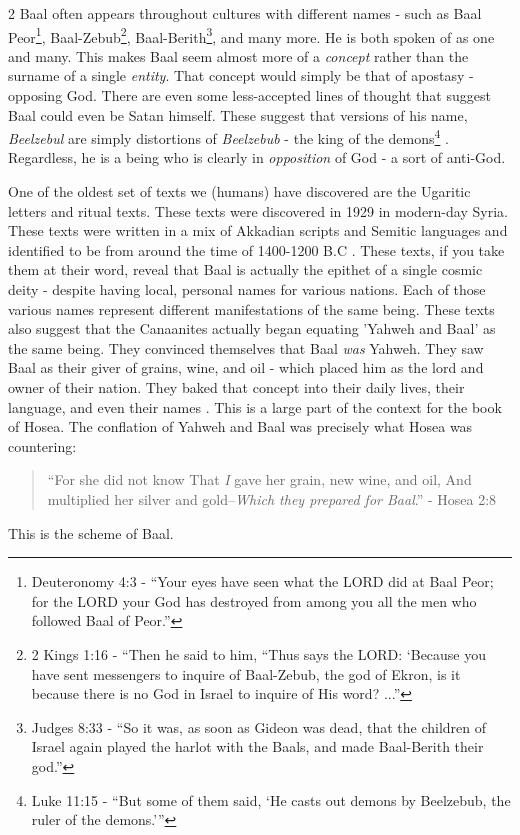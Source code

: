 \documentclass[10pt]{article}
\begin{document}
\begin{multicols}{2}
Baal often appears throughout cultures with different names - such as Baal Peor\footnote{Deuteronomy 4:3 - ``Your eyes have seen what the LORD did at Baal Peor; for the LORD your God has destroyed from among you all the men who followed Baal of Peor.''}, Baal-Zebub\footnote{2 Kings 1:16 - ``Then he said to him, ``Thus says the LORD: ‘Because you have sent messengers to inquire of Baal-Zebub, the god of Ekron, is it because there is no God in Israel to inquire of His word? ...''}, Baal-Berith\footnote{Judges 8:33 - ``So it was, as soon as Gideon was dead, that the children of Israel again played the harlot with the Baals, and made Baal-Berith their god.''}, and many more. He is both spoken of as one and many. This makes Baal seem almost more of a \textit{concept} rather than the surname of a single \textit{entity}. That concept would simply be that of apostasy - opposing God. There are even some less-accepted lines of thought that suggest Baal could even be Satan himself. These suggest that versions of his name, \textit{Beelzebul} are simply distortions of \textit{Beelzebub} - the king of the demons\footnote{Luke 11:15 - ``But some of them said, `He casts out demons by Beelzebub, the ruler of the demons.'\thinspace''} \cite{Yahweh and gods}. Regardless, he is a being who is clearly in \textit{opposition} of God - a sort of anti-God.

One of the oldest set of texts we (humans) have discovered are the Ugaritic letters and ritual texts. These texts were discovered in 1929 in modern-day Syria. These texts were written in a mix of Akkadian scripts and Semitic languages and identified to be from around the time of 1400-1200 B.C \cite{Ugaritic Letters}. These texts, if you take them at their word, reveal that Baal is actually the epithet of a single cosmic deity - despite having local, personal names for various nations. Each of those various names represent different manifestations of the same being. These texts also suggest that the Canaanites actually began equating 'Yahweh and Baal' as the same being. They convinced themselves that Baal \textit{was} Yahweh. They saw Baal as their giver of grains, wine, and oil - which placed him as the lord and owner of their nation. They baked that concept into their daily lives, their language, and even their names \cite{Yahweh and gods}. This is a large part of the context for the book of Hosea. The conflation of Yahweh and Baal was precisely what Hosea was countering:
\begin{quotation}
``For she did not know That \textit{I} gave her grain, new wine, and oil, And multiplied her silver and gold--\textit{Which they prepared for Baal}.'' - Hosea 2:8
\end{quotation}
This is the scheme of Baal. 


\end{multicols}
\end{document}
